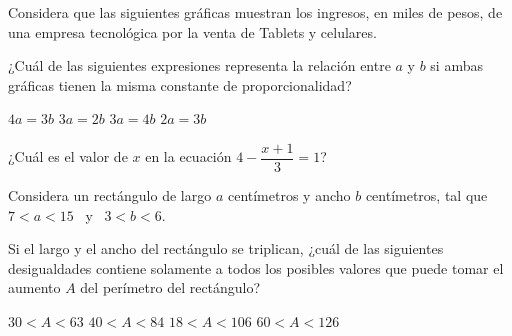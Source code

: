 \documentclass[sin nombre]{srs}
\begin{document}
\begin{preguntas}[after-item-skip=1cm]
\pregunta Considera que las siguientes gráficas muestran los ingresos, en miles de pesos, de una empresa tecnológica por la venta de Tablets y celulares.
\begin{tcolorbox}
\tcblower
{}
\end{tcolorbox}
¿Cuál de las siguientes expresiones representa la relación entre $a$ y $b$ si ambas gráficas tienen la misma constante de proporcionalidad?
\begin{vertical}
\alternativa $4a = 3b$
\alternativa $3a = 2b$
\alternativa $3a = 4b$
\alternativa $2a = 3b$
\end{vertical}

\pregunta ¿Cuál es el valor de $x$ en la ecuación $4 - \dfrac{x+1}{3} = 1$?
\begin{vertical}
\end{vertical}

\pregunta Considera un rectángulo de largo $a$ centímetros y ancho $b$
centímetros, tal que ~$7 < a < 15$~ y ~$3 < b < 6$.

Si el largo y el ancho
del rectángulo se triplican, ¿cuál de las siguientes desigualdades
contiene solamente a todos los posibles valores que puede tomar el
aumento $A$ del perímetro del rectángulo?
\begin{vertical}
\alternativa $30 < A < 63$
\alternativa $40 < A < 84$
\alternativa $18 < A < 106$
\alternativa $60 < A < 126$
\end{vertical}


\end{preguntas}
\end{document}
